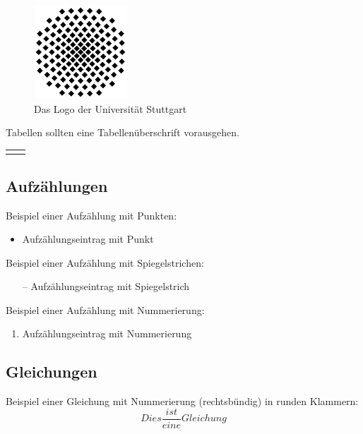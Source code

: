 \documentclass[12pt,paper=a4]{scrartcl}
\begin{document}
\begin{figure}[h]
	\centering
	\includegraphics[height=3.5cm]{graphics/uni-stuttgart-logo}
	\caption{Das Logo der Universität Stuttgart}
	\label{fig:uni-stuttgart-logo}
\end{figure}

Tabellen sollten eine Tabellenüberschrift vorausgehen.

\begin{table}[h]
	\centering
	\begin{tabular}{|p{5cm}|p{5cm}|} \hline
		 & \\ \hline
		 & \\ \hline
	\end{tabular}
\end{table}

\subsection{Aufzählungen}
Beispiel einer Aufzählung mit Punkten:
\begin{itemize}
	\item Aufzählungseintrag mit Punkt
\end{itemize}
Beispiel einer Aufzählung mit Spiegelstrichen:
\begin{itemize}
	\item[--] Aufzählungseintrag mit Spiegelstrich
\end{itemize}
Beispiel einer Aufzählung mit Nummerierung:
\begin{enumerate}
	\item Aufzählungseintrag mit Nummerierung
\end{enumerate}


\subsection{Gleichungen}
Beispiel einer Gleichung mit Nummerierung (rechtsbündig) in runden Klammern:
\begin{equation}
	Dies \frac{ist}{eine}Gleichung
\end{equation}
\end{document}
